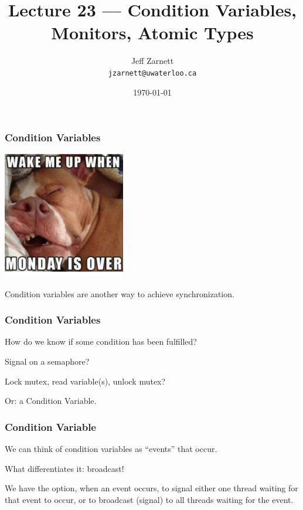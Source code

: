 

\title{Lecture 23 --- Condition Variables, Monitors, Atomic Types }

\author{Jeff Zarnett \\ \small \texttt{jzarnett@uwaterloo.ca}}
\date{\today}




\begin{frame}
	\titlepage

\end{frame}


\begin{frame}
	\frametitle{Condition Variables}

	\begin{center}
		\includegraphics[width=0.4\textwidth]{images/monday.png}
	\end{center}

	Condition variables are another way to achieve synchronization.

\end{frame}

\begin{frame}
	\frametitle{Condition Variables}

	How do we know if some condition has been fulfilled?

	Signal on a semaphore?

	Lock mutex, read variable(s), unlock mutex?

	Or: a Condition Variable.

\end{frame}


\begin{frame}
	\frametitle{Condition Variable}

	We can think of condition variables as ``events'' that occur.

	What differentiates it: broadcast!

	We have the option, when an event occurs, to signal either one thread waiting for that event to occur, or to broadcast (signal) to all threads waiting for the event.

\end{frame}

